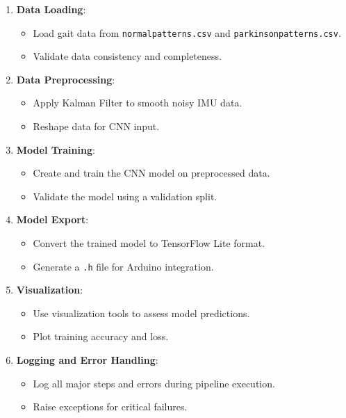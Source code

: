 \begin{enumerate}
	\item \textbf{Data Loading}:
	\begin{itemize}
		\item Load gait data from \texttt{normalpatterns.csv} and \texttt{parkinsonpatterns.csv}.
		\item Validate data consistency and completeness.
	\end{itemize}
	
	\item \textbf{Data Preprocessing}:
	\begin{itemize}
		\item Apply Kalman Filter to smooth noisy IMU data.
		\item Reshape data for CNN input.
	\end{itemize}
	
	\item \textbf{Model Training}:
	\begin{itemize}
		\item Create and train the CNN model on preprocessed data.
		\item Validate the model using a validation split.
	\end{itemize}
	
	\item \textbf{Model Export}:
	\begin{itemize}
		\item Convert the trained model to TensorFlow Lite format.
		\item Generate a \texttt{.h} file for Arduino integration.
	\end{itemize}
	
	\item \textbf{Visualization}:
	\begin{itemize}
		\item Use visualization tools to assess model predictions.
		\item Plot training accuracy and loss.
	\end{itemize}
	
	\item \textbf{Logging and Error Handling}:
	\begin{itemize}
		\item Log all major steps and errors during pipeline execution.
		\item Raise exceptions for critical failures.
	\end{itemize}
\end{enumerate}

